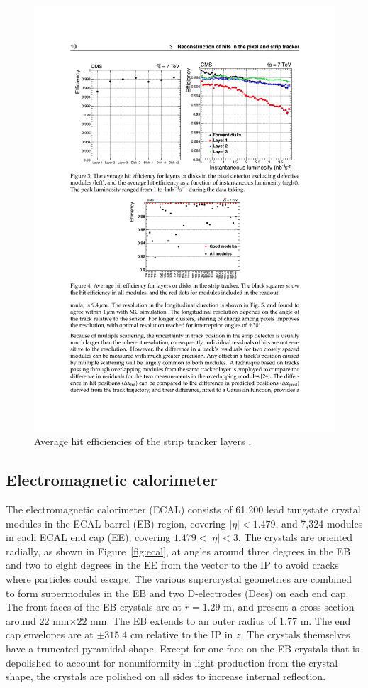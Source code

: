 \begin{figure}[tbh]
\centering
\includegraphics[width=5in]{figures/stripeff.pdf}
\caption{Average hit efficiencies of the strip tracker layers \cite{1748-0221-3-08-S08004}.}
\label{fig:stripeff}
\end{figure}

\subsection{Electromagnetic calorimeter}

The electromagnetic calorimeter (ECAL) consists of 61,200 lead tungstate crystal modules in the ECAL barrel (EB) region, covering $|\eta|<1.479$, and 7,324 modules in each ECAL end cap (EE), covering $1.479<|\eta|<3$. The crystals are oriented radially, as shown in Figure~\ref{fig:ecal}, at angles around three degrees in the EB and two to eight degrees in the EE from the vector to the IP to avoid cracks where particles could escape. The various supercrystal geometries are combined to form supermodules in the EB and two D-electrodes (Dees) on each end cap. The front faces of the EB crystals are at $r=1.29$ m, and present a cross section around $22$ mm$\times$$22$ mm. The EB extends to an outer radius of 1.77 m. The end cap envelopes are at $\pm315.4$ cm relative to the IP in $z$. The crystals themselves have a truncated pyramidal shape. Except for one face on the EB crystals that is depolished to account for nonuniformity in light production from the crystal shape, the crystals are polished on all sides to increase internal reflection. 

